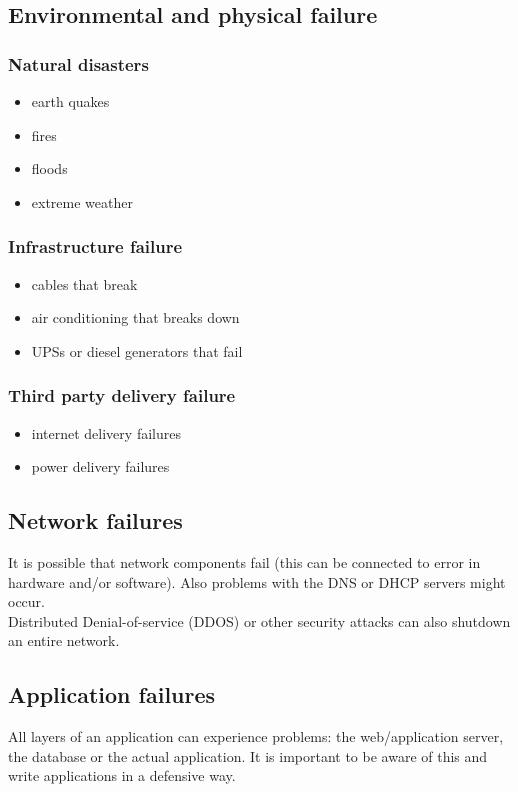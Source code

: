 \documentclass[12pt]{report}
\begin{document}
\subsection{Environmental and physical failure}
\subsubsection{Natural disasters}
\begin{itemize}
\item earth quakes
\item fires
\item floods
\item extreme weather
\end{itemize}
\subsubsection{Infrastructure failure}
\begin{itemize}
\item cables that break
\item air conditioning that breaks down
\item UPSs or diesel generators that fail
\end{itemize}
\subsubsection{Third party delivery failure}
\begin{itemize}
\item internet delivery failures
\item power delivery failures
\end{itemize}

\subsection{Network failures}
It is possible that network components fail (this can be connected to
error in hardware and/or
software). Also problems with the DNS or DHCP servers might occur.\\
Distributed Denial-of-service (DDOS) or other security 
 attacks can also shutdown an entire network.

\subsection{Application failures}
All layers of an application can experience problems: the web/application
server, the database or the actual application. It is important to be
aware of this and write applications in a defensive way.
\end{document}
